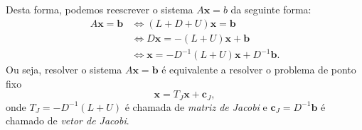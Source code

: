 Desta forma, podemos reescrever o sistema $A\pmb{x}=b$ da seguinte forma:
\begin{align}
  A\pmb{x} = \pmb{b} &\Leftrightarrow (L + D + U)\pmb{x} = \pmb{b}\\
         &\Leftrightarrow D\pmb{x} = -(L+U)\pmb{x} + \pmb{b}\\
         &\Leftrightarrow \pmb{x} = -D^{-1}(L+U)\pmb{x} + D^{-1}\pmb{b}.
\end{align}
Ou seja, resolver o sistema $A\pmb{x} = \pmb{b}$ é equivalente a resolver o problema de ponto fixo
\begin{equation}
  \pmb{x} = T_J\pmb{x} + \pmb{c}_J,
\end{equation}
onde $T_J = -D^{-1}(L+U)$ é chamada de \emph{matriz de Jacobi} e $\pmb{c}_J = D^{-1}\pmb{b}$ é chamado de \emph{vetor de Jacobi}.

